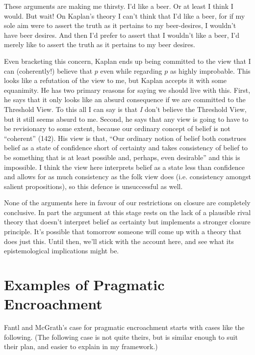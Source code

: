 These arguments are making me thirsty. I'd like a beer. Or at least I think I would. But wait! On Kaplan's theory I can't think that I'd like a beer, for if my sole aim were to assert the truth as it pertains to my beer-desires, I wouldn't have beer desires. And then I'd prefer to assert that I wouldn't like a beer, I'd merely like to assert the truth as it pertains to my beer desires. 

Even bracketing this concern, Kaplan ends up being committed to the view that I can (coherently!) believe that \(p\) even while regarding \(p\) as highly improbable. This looks like a refutation of the view to me, but Kaplan accepts it with some equanimity. He has two primary reasons for saying we should live with this. First, he says that it only looks like an absurd consequence if we are committed to the Threshold View. To this all I can say is that \textit{I} don't believe the Threshold View, but it still seems absurd to me. Second, he says that any view is going to have to be revisionary to some extent, because our ordinary concept of belief is not ``coherent'' (142). His view is that, ``Our ordinary notion of belief both construes belief as a state of confidence short of certainty and takes consistency of belief to be something that is at least possible and, perhaps, even desirable'' and this is impossible. I think the view here interprets belief as a state less than confidence and allows for as much consistency as the folk view does (i.e. consistency amongst salient propositions), so this defence is unsuccessful as well.

None of the arguments here in favour of our restrictions on closure are completely conclusive. In part the argument at this stage rests on the lack of a plausible rival theory that doesn't interpret belief as certainty but implements a stronger closure principle. It's possible that tomorrow someone will come up with a theory that does just this. Until then, we'll stick with the account here, and see what its epistemological implications might be.

\section{Examples of Pragmatic Encroachment}

Fantl and McGrath's case for pragmatic encroachment starts with cases like the following. (The following case is not quite theirs, but is similar enough to suit their plan, and easier to explain in my framework.)

